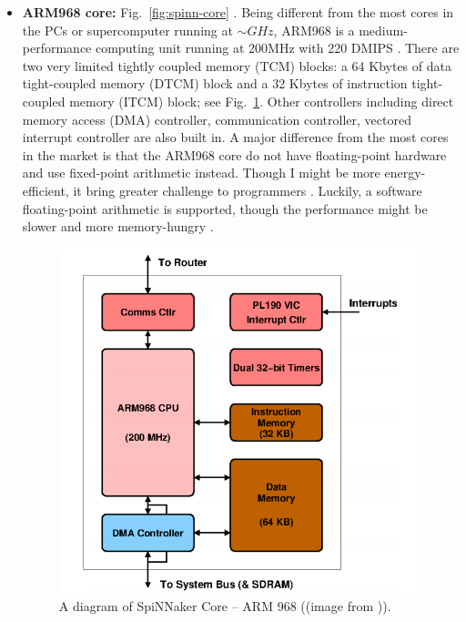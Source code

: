 \begin{itemize}
    \item \textbf{ARM968 core:} Fig.~\ref{fig:spinn-core} . Being different from the most cores in the PCs or supercomputer running at $\sim GHz$, ARM968 is a medium-performance computing unit running at 200MHz with 220 DMIPS \cite{furber2012overview}. There are two very limited tightly coupled memory (TCM) blocks: a 64 Kbytes of data tight-coupled memory (DTCM) block and a 32 Kbytes of instruction tight-coupled memory (ITCM) block; see Fig.~\ref{fig:arm_968}. Other controllers including direct memory access (DMA) controller, communication controller, vectored interrupt controller are also built in. A major difference from the most cores in the market is that the ARM968 core do not have floating-point hardware and use fixed-point arithmetic instead. Though I might be more energy-efficient, it bring greater challenge to programmers \cite{furber2012overview}. Luckily, a software floating-point arithmetic is supported, though the performance might be slower and more memory-hungry \cite{spin-chip-resources}.
    \begin{figure}[!tb]
   \centering
       \includegraphics[width=1\textwidth]{figures/core.png}
       \caption{A diagram of SpiNNaker Core -- ARM 968 ((image from \cite{spin-chip-resources})).}
       \label{fig:arm_968}
    \end{figure}
    

\end{itemize}
